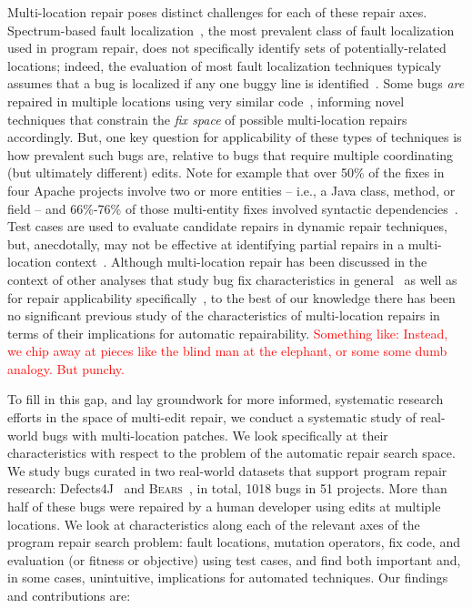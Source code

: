 \documentclass[10pt, conference]{IEEEtran}
\newcommand\todo[1]{\textcolor{red}{#1}}
\newcommand\bears{\textsc{Bears}\xspace}
\begin{document}
Multi-location repair poses distinct challenges for each of these repair axes.
Spectrum-based fault localization~\cite{ochiai}, the most prevalent class of
fault localization used in program repair, does not specifically
identify sets of potentially-related locations; indeed,
the evaluation of most fault localization techniques typicaly assumes that a bug
is localized if any one buggy line is identified~\cite{fl-survey-wong}.
Some bugs \emph{are}
repaired in multiple locations using very similar
code~\cite{saha2019harnessing,jiang2019cmsuggester}, informing novel techniques
that constrain the \emph{fix space} of possible multi-location repairs accordingly.
But, one key question for applicability of these types of techniques is how prevalent
such bugs are, relative to bugs that require multiple
coordinating (but ultimately different) edits.
Note for example that over 50\% of the fixes in four 
Apache projects involve two or more entities -- i.e., a Java class, method, or field -- and 66\%-76\% of 
those multi-entity fixes involved syntactic dependencies~\cite{wang2018}. 
Test cases are used to evaluate candidate repairs in dynamic
repair techniques, but, anecdotally, may not be effective
at identifying partial repairs in a multi-location
context~\cite{better-fitness}.  
Although multi-location repair has been discussed in the context of other analyses
that study bug fix characteristics in general~\cite{d4j-dissection} as well as for
repair applicability specifically~\cite{zhong2015, wang2018}, to the best of our
knowledge there has been no significant previous study of the characteristics of
multi-location repairs in terms of their implications for automatic
repairability.  \todo{Something like: Instead, we chip away at pieces like the
  blind man at the elephant, or some some dumb analogy.  But punchy.}

To fill in this gap, and lay groundwork for more informed, systematic research
efforts in the space of multi-edit repair, we conduct a systematic study of real-world bugs with
multi-location patches.  We
look specifically at their characteristics with respect to the problem of the
automatic repair search space.  
We study bugs curated in two
real-world datasets that support program repair research: Defects4J~\cite{defects4j}
and \bears~\cite{bears}, in total, 1018 bugs in 51 projects.
More than half of these bugs were repaired by a
human developer using edits at multiple locations.  We look at characteristics along each of the
relevant axes of the program repair search problem: fault locations, mutation
operators, fix code, and evaluation (or fitness or objective) using test cases,
and find both important and, in some cases, unintuitive, implications for
automated techniques.  Our findings and contributions are:
\end{document}
